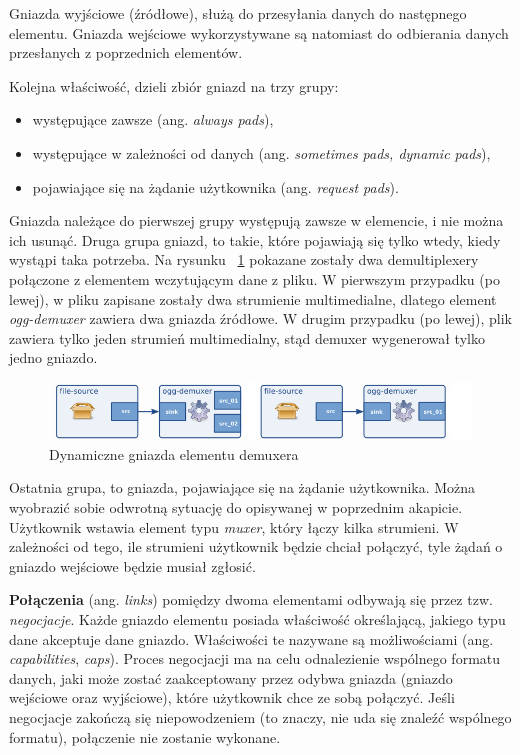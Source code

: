 \documentclass[12pt]{article}
\begin{document}
Gniazda wyjściowe (źródłowe), służą do przesyłania danych do następnego elementu. Gniazda wejściowe wykorzystywane są natomiast do odbierania danych przesłanych z poprzednich elementów.

Kolejna właściwość, dzieli zbiór gniazd na trzy grupy:
\begin{itemize}
 \setlength{\itemsep}{0em}
  \item występujące zawsze (ang. \textit{always pads}),
  \item występujące w zależności od danych (ang. \textit{sometimes pads, dynamic pads}),
  \item pojawiające się na żądanie użytkownika (ang. \textit{request pads}).
\end{itemize}

Gniazda należące do pierwszej grupy występują zawsze w elemencie, i nie można ich usunąć.
Druga grupa gniazd, to takie, które pojawiają się tylko wtedy, kiedy wystąpi taka potrzeba. Na rysunku ~\ref{fig:requestPadsDemux} pokazane zostały dwa demultiplexery połączone z elementem wczytującym dane z pliku. W pierwszym przypadku (po lewej), w pliku zapisane zostały dwa strumienie multimedialne, dlatego element \textit{ogg-demuxer} zawiera dwa gniazda źródłowe. W drugim przypadku (po lewej), plik zawiera tylko jeden strumień multimedialny, stąd demuxer wygenerował tylko jedno gniazdo.
\begin{figure}[H]
  \includegraphics[width=150mm]{img/request-pads-demux.png}
  \caption{Dynamiczne gniazda elementu demuxera \cite{gstmainpage}}
  \label{fig:requestPadsDemux}
\end{figure}
Ostatnia grupa, to gniazda, pojawiające się na żądanie użytkownika. Można wyobrazić sobie odwrotną sytuację do opisywanej w poprzednim akapicie. Użytkownik wstawia element typu \textit{muxer}, który łączy kilka strumieni. W zależności od tego, ile strumieni użytkownik będzie chciał połączyć, tyle żądań o gniazdo wejściowe będzie musiał zgłosić.

\textbf{Połączenia} (ang. \textit{links}) pomiędzy dwoma elementami odbywają się przez tzw. \textit{negocjacje}. Każde gniazdo elementu posiada właściwość określającą, jakiego typu dane akceptuje dane gniazdo. Właściwości te nazywane są możliwościami (ang. \textit{capabilities}, \textit{caps}). Proces negocjacji ma na celu odnalezienie wspólnego formatu danych, jaki może zostać zaakceptowany przez odybwa gniazda (gniazdo wejściowe oraz wyjściowe), które użytkownik chce ze sobą połączyć. Jeśli negocjacje zakończą się niepowodzeniem (to znaczy, nie uda się znaleźć wspólnego formatu), połączenie nie zostanie wykonane.
\end{document}
